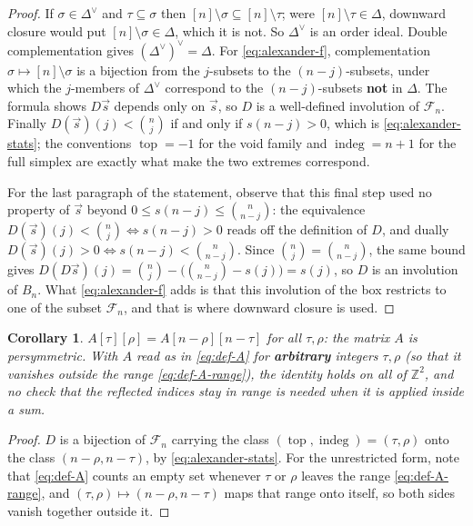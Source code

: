 \documentclass[11pt, a4paper, abstract=yes]{scrartcl}
\theoremstyle{definition}
\theoremstyle{remark}
\theoremstyle{plain}
\newtheorem{corollary}[definition]{Corollary}
\newcommand{\indeg}{\operatorname{indeg}}
\newcommand{\tp}{\operatorname{top}}
\begin{document}
\begin{proof}
If \(\sigma\in\Delta^{\vee}\) and \(\tau\subseteq\sigma\) then \([n]\setminus\sigma\subseteq
[n]\setminus\tau\); were \([n]\setminus\tau\in\Delta\), downward closure would put
\([n]\setminus\sigma\in\Delta\), which it is not. So \(\Delta^{\vee}\) is an order ideal. Double
complementation gives \((\Delta^{\vee})^{\vee}=\Delta\). For \eqref{eq:alexander-f}, complementation
\(\sigma\mapsto[n]\setminus\sigma\) is a bijection from the \(j\)-subsets to the \((n-j)\)-subsets,
under which the \(j\)-members of \(\Delta^{\vee}\) correspond to the \((n-j)\)-subsets \textbf{not} in
\(\Delta\). The formula shows \(D\vec s\) depends only on \(\vec s\), so \(D\) is a well-defined
involution of \(\mathcal F_n\). Finally \(D(\vec s)(j)<\binom nj\) if and only if \(s(n-j)>0\), which
is \eqref{eq:alexander-stats}; the conventions \(\tp=-1\) for the void family and
\(\indeg=n+1\) for the full simplex are exactly what make the two extremes correspond.

For the last paragraph of the statement, observe that this final step used no property of \(\vec s\)
beyond \(0\le s(n-j)\le\binom n{n-j}\): the equivalence \(D(\vec s)(j)<\binom nj\iff s(n-j)>0\) reads
off the definition of \(D\), and dually \(D(\vec s)(j)>0\iff s(n-j)<\binom n{n-j}\). Since
\(\binom nj=\binom n{n-j}\), the same bound gives
\(D(D\vec s)(j)=\binom nj-\bigl(\binom n{n-j}-s(j)\bigr)=s(j)\), so \(D\) is an involution of
\(B_n\). What \eqref{eq:alexander-f} adds is that this involution of the box restricts to one of the
subset \(\mathcal F_n\), and that is where downward closure is used.
\end{proof}

\begin{corollary}
\(A[\tau][\rho]=A[n-\rho][n-\tau]\) for all \(\tau,\rho\): the matrix \(A\) is persymmetric. With
\(A\) read as in \eqref{eq:def-A} for \textbf{arbitrary} integers \(\tau,\rho\) (so that it vanishes
outside the range \eqref{eq:def-A-range}), the identity holds on all of \(\mathbb Z^2\), and no
check that the reflected indices stay in range is needed when it is applied inside a sum.
\label{cor-persymmetry}
\end{corollary}

\begin{proof}
\(D\) is a bijection of \(\mathcal F_n\) carrying the class \((\tp,\indeg)=(\tau,\rho)\) onto the class
\((n-\rho,n-\tau)\), by \eqref{eq:alexander-stats}. For the unrestricted form, note that
\eqref{eq:def-A} counts an empty set whenever \(\tau\) or \(\rho\) leaves the range
\eqref{eq:def-A-range}, and \((\tau,\rho)\mapsto(n-\rho,n-\tau)\) maps that range onto itself, so both
sides vanish together outside it.
\end{proof}
\end{document}
